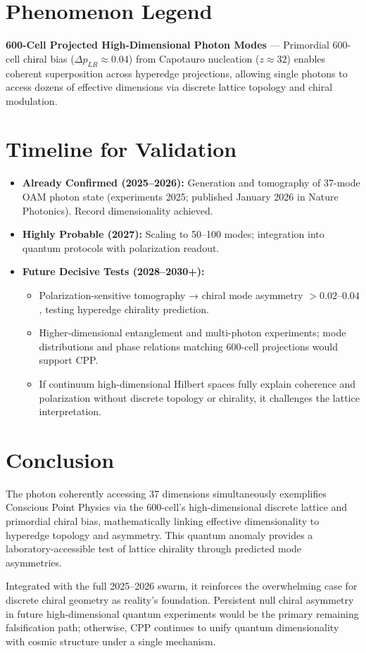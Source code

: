 \documentclass[11pt]{article}
\begin{document}
\section{Phenomenon Legend}
\textbf{600-Cell Projected High-Dimensional Photon Modes} — Primordial 600-cell chiral bias ($\Delta p_{LR} \approx 0.04$) from Capotauro nucleation ($z \approx 32$) enables coherent superposition across hyperedge projections, allowing single photons to access dozens of effective dimensions via discrete lattice topology and chiral modulation.

\section{Timeline for Validation}
\begin{itemize}
    \item \textbf{Already Confirmed (2025--2026):} Generation and tomography of 37-mode OAM photon state (experiments 2025; published January 2026 in Nature Photonics). Record dimensionality achieved.
    \item \textbf{Highly Probable (2027):} Scaling to 50--100 modes; integration into quantum protocols with polarization readout.
    \item \textbf{Future Decisive Tests (2028--2030+):}
    \begin{itemize}
        \item Polarization-sensitive tomography → chiral mode asymmetry $>0.02$--$0.04$, testing hyperedge chirality prediction.
        \item Higher-dimensional entanglement and multi-photon experiments; mode distributions and phase relations matching 600-cell projections would support CPP.
        \item If continuum high-dimensional Hilbert spaces fully explain coherence and polarization without discrete topology or chirality, it challenges the lattice interpretation.
    \end{itemize}
\end{itemize}

\section{Conclusion}
The photon coherently accessing 37 dimensions simultaneously exemplifies Conscious Point Physics via the 600-cell's high-dimensional discrete lattice and primordial chiral bias, mathematically linking effective dimensionality to hyperedge topology and asymmetry. This quantum anomaly provides a laboratory-accessible test of lattice chirality through predicted mode asymmetries.  

Integrated with the full 2025--2026 swarm, it reinforces the overwhelming case for discrete chiral geometry as reality's foundation. Persistent null chiral asymmetry in future high-dimensional quantum experiments would be the primary remaining falsification path; otherwise, CPP continues to unify quantum dimensionality with cosmic structure under a single mechanism.
\end{document}

